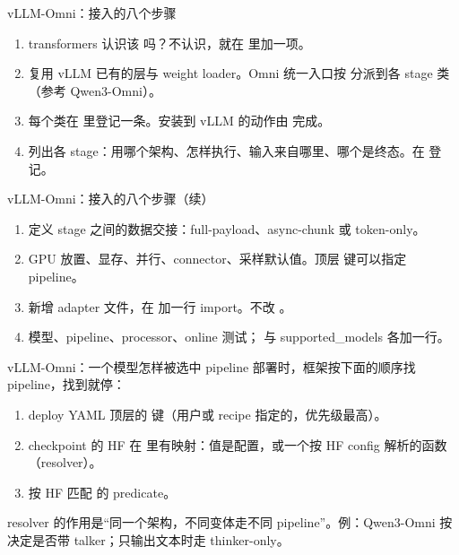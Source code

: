 \begin{frame}[t]{vLLM-Omni：接入的八个步骤}
\small
\begin{enumerate}
  \item {}transformers 认识该  吗？不认识，就在  里加一项。
  \item {}复用 vLLM 已有的层与 weight loader。Omni 统一入口按  分派到各 stage 类（参考 Qwen3-Omni）。
  \item {}每个类在  里登记一条。安装到 vLLM 的动作由  完成。
  \item {} 列出各 stage：用哪个架构、怎样执行、输入来自哪里、哪个是终态。在  登记。
\end{enumerate}
\vspace{6pt}
\end{frame}

\begin{frame}[t]{vLLM-Omni：接入的八个步骤（续）}
\small
\setcounter{enumi}{4}
\begin{enumerate}
  \item {}定义 stage 之间的数据交接：full-payload、async-chunk 或 token-only。
  \item {}GPU 放置、显存、并行、connector、采样默认值。顶层  键可以指定 pipeline。
  \item {}新增 adapter 文件，在  加一行 import。不改 。
  \item {}模型、pipeline、processor、online 测试； 与 supported\_models 各加一行。
\end{enumerate}
\end{frame}

\begin{frame}[t]{vLLM-Omni：一个模型怎样被选中 pipeline}
\small
部署时，框架按下面的顺序找 pipeline，找到就停：
\begin{enumerate}
  \item deploy YAML 顶层的  键（用户或 recipe 指定的，优先级最高）。
  \item checkpoint 的 HF  在  里有映射：值是配置，或一个按 HF config 解析的函数（resolver）。
  \item 按 HF  匹配  的 predicate。
\end{enumerate}
\vspace{4pt}
resolver 的作用是“同一个架构，不同变体走不同 pipeline”。例：Qwen3-Omni 按  决定是否带 talker；只输出文本时走 thinker-only。
\end{frame}

